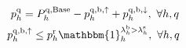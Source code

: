 \documentclass[conference]{IEEEtran}
\begin{document}
{\begin{subequations}
\begin{align}
           & \ p_{h}^{\rm{q}} = P^{\rm{q},\rm{Base}}_{h} - p^{\rm{q},\rm{b}, \uparrow}_{h} + p^{\rm{q},\rm{b}, \downarrow}_{h}, \                                                                                                  \forall{h, q}                                                                             \label{power:6q}                                                                                                                                                                                                                           \\
        \  & p^{\rm{q},\rm{b}, \uparrow}_{h} \leq p^{\rm{r}}_h \mathbbm{1}_{h}^{\lambda^{\rm{b}}_{h} > \lambda^{\rm{s}}_{h}} , \                                                                            \forall{h,q}                                                                             \label{power:8q}                                                                                                                                                                                                          \\

\end{align}
\end{subequations}}
\end{document}
